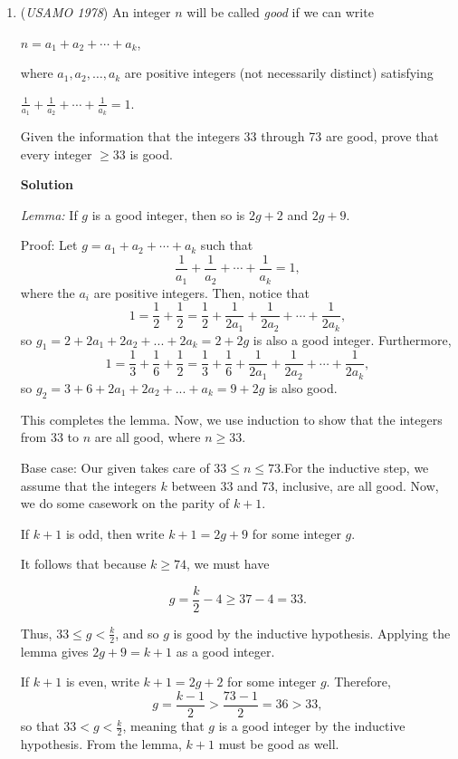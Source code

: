 \begin{enumerate}
 


	\item (\textit{USAMO 1978}) An integer $n$ will be called \textit{good} if we can write


 $n=a_1+a_2+\cdots+a_k$,


 where $a_1,a_2, \ldots, a_k$ are positive integers (not necessarily distinct) satisfying


 $\frac{1}{a_1}+\frac{1}{a_2}+\cdots+\frac{1}{a_k}=1$.


 Given the information that the integers 33 through 73 are good, prove that every integer $\ge 33$ is good.


 



\textbf{Solution}

\textit{Lemma:} If $g$ is a good integer, then so is $2g + 2$ and $2g + 9$.

 Proof: Let $g = a_1 + a_2 + \cdots + a_k$ such that 
 \[\frac{1}{a_1}+\frac{1}{a_2}+\cdots+\frac{1}{a_k}=1,\] where the $a_i$ are positive integers. Then, notice that 
 \[1 = \frac{1}{2} + \frac{1}{2} = \frac{1}{2} + \frac{1}{2a_1}+\frac{1}{2a_2}+\cdots+\frac{1}{2a_k},\] so $g_1 = 2 + 2a_1 + 2a_2 + ... + 2a_k = 2 + 2g$ is also a good integer. Furthermore, 
 \[1 = \frac{1}{3} + \frac{1}{6} + \frac{1}{2} = \frac{1}{3} + \frac{1}{6} + \frac{1}{2a_1}+\frac{1}{2a_2}+\cdots+\frac{1}{2a_k},\] so $g_2 = 3 + 6 + 2a_1 + 2a_2 + ... + a_k = 9 + 2g$ is also good.

 This completes the lemma. Now, we use induction to show that the integers from 33 to $n$ are all good, where $n \ge 33$.

 Base case: Our given takes care of $33 \le n \le 73$.For the inductive step, we assume that the integers $k$ between $33$ and $73$, inclusive, are all good. Now, we do some casework on the parity of $k+1$.

 If $k+1$ is odd, then write $k+1 = 2g + 9$ for some integer $g$.

 It follows that because $k \ge 74$, we must have

 
 \[g = \frac{k}{2} - 4 \ge 37 - 4 = 33.\]

 Thus, $33 \le g < \frac{k}{2}$, and so $g$ is good by the inductive hypothesis. Applying the lemma gives $2g + 9 = k+1$ as a good integer.

 If $k+1$ is even, write $k+1 = 2g+2$ for some integer $g$. Therefore, 
 \[g = \frac{k-1}{2} > \frac{73-1}{2} = 36 > 33,\] so that $33 < g < \frac{k}{2}$, meaning that $g$ is a good integer by the inductive hypothesis. From the lemma, $k+1$ must be good as well.


\end{enumerate}
